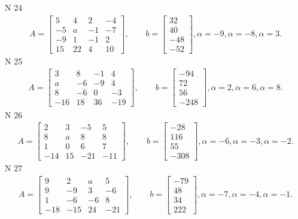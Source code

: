 \documentclass[11pt]{report}
\begin{document}
N 24
\begin{align*}
 A = \left[\begin{matrix}5 & 4 & 2 & -4\\-5 & a & -1 & -7\\-9 & 1 & -1 & 2\\15 & 22 & 4 & 10\end{matrix}\right],
    \qquad b = \left[\begin{matrix}32\\40\\-48\\-52\end{matrix}\right], \alpha = -9, \alpha = -8, \alpha = 3. 
 \end{align*}
N 25
\begin{align*}
 A = \left[\begin{matrix}3 & 8 & -1 & 4\\a & -6 & -9 & 4\\8 & -6 & 0 & -3\\-16 & 18 & 36 & -19\end{matrix}\right],
    \qquad b = \left[\begin{matrix}-94\\72\\56\\-248\end{matrix}\right], \alpha = 2, \alpha = 6, \alpha = 8. 
 \end{align*}
N 26
\begin{align*}
 A = \left[\begin{matrix}2 & 3 & -5 & 5\\8 & a & 8 & 8\\1 & 0 & 6 & 7\\-14 & 15 & -21 & -11\end{matrix}\right],
    \qquad b = \left[\begin{matrix}-28\\116\\55\\-308\end{matrix}\right], \alpha = -6, \alpha = -3, \alpha = -2. 
 \end{align*}
N 27
\begin{align*}
 A = \left[\begin{matrix}9 & 2 & a & 5\\9 & -9 & 3 & -6\\1 & -6 & -6 & 8\\-18 & -15 & 24 & -21\end{matrix}\right],
    \qquad b = \left[\begin{matrix}-79\\48\\34\\222\end{matrix}\right], \alpha = -7, \alpha = -4, \alpha = -1. 
 \end{align*}
\end{document}
